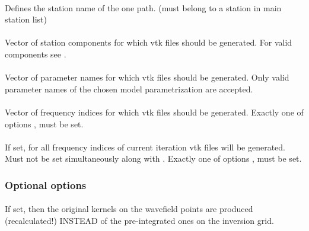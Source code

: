 \paragraph{ }
Defines the station name of the one path. (must belong to a station in main station list)
\paragraph{}
Vector of station components for which vtk files should be generated. For valid components see .
\paragraph{}
Vector of parameter names for which vtk files should be generated. Only valid parameter names of the chosen model parametrization are accepted. 
\paragraph{}
Vector of  frequency indices for which vtk files should be generated. 
Exactly one of options  ,  must be set.
\paragraph{}
If set, for all frequency indices of current iteration vtk files will be generated. Must not be set simultaneously along with .
Exactly one of options  ,  must be set.
\subsubsection{Optional options}
\paragraph{}
If set, then the original kernels on the wavefield points are produced (recalculated!) INSTEAD of the pre-integrated ones on the inversion grid.
%
%
